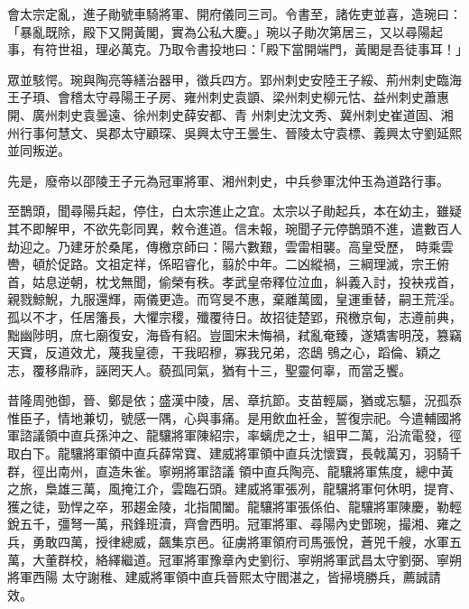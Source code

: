 \begin{pinyinscope}
 會太宗定亂，進子勛號車騎將軍、開府儀同三司。令書至，諸佐吏並喜，造琬曰：「暴亂既除，殿下又開黃閣，實為公私大慶。」琬以子勛次第居三，又以尋陽起事，有符世祖，理必萬克。乃取令書投地曰：「殿下當開端門，黃閣是吾徒事耳！」



 眾並駭愕。琬與陶亮等繕治器甲，徵兵四方。郢州刺史安陸王子綏、荊州刺史臨海王子頊、會稽太守尋陽王子房、雍州刺史袁顗、梁州刺史柳元怙、益州刺史蕭惠開、廣州刺史袁曇遠、徐州刺史薛安都、青
 州刺史沈文秀、冀州刺史崔道固、湘州行事何慧文、吳郡太守顧琛、吳興太守王曇生、晉陵太守袁標、義興太守劉延熙並同叛逆。



 先是，廢帝以邵陵王子元為冠軍將軍、湘州刺史，中兵參軍沈仲玉為道路行事。



 至鵲頭，聞尋陽兵起，停住，白太宗進止之宜。太宗以子勛起兵，本在幼主，雖疑其不即解甲，不欲先彰同異，敕令進道。信未報，琬聞子元停鵲頭不進，遣數百人劫迎之。乃建牙於桑尾，傳檄京師曰：陽六數艱，雲雷相襲。高皇受歷，
 時乘雲轡，頓於促路。文祖定祥，係昭睿化，翦於中年。二凶縱禍，三綱理滅，宗王俯首，姑息逆朝，枕戈無聞，偷榮有秩。孝武皇帝釋位泣血，糾義入討，投袂戎首，親戮鯨鯢，九服還輝，兩儀更造。而穹旻不惠，棄離萬國，皇運重替，嗣王荒淫。孤以不才，任居籓長，大懼宗稷，殲覆待日。故招徒楚郢，飛檄京甸，志遵前典，黜幽陟明，庶七廟復安，海昏有紹。豈圖宋未悔禍，弒亂奄臻，遂矯害明茂，篡竊天寶，反道效尤，蔑我皇德，干我昭穆，寡我兄弟，恣鴟
 鴞之心，蹈倫、穎之志，覆移鼎祚，誣罔天人。藐孤同氣，猶有十三，聖靈何辜，而當乏饗。



 昔隆周弛御，晉、鄭是依；盛漢中陵，居、章抗節。支苗輕屬，猶或忘驅，況孤忝惟臣子，情地兼切，號感一隅，心與事痛。是用飲血衽金，誓復宗祀。今遣輔國將軍諮議領中直兵孫沖之、龍驤將軍陳紹宗，率螭虎之士，組甲二萬，沿流電發，徑取白下。龍驤將軍領中直兵薛常寶、建威將軍領中直兵沈懷寶，長戟萬刃，羽騎千群，徑出南州，直造朱雀。寧朔將軍諮議
 領中直兵陶亮、龍驤將軍焦度，總中黃之旅，梟雄三萬，風掩江介，雲臨石頭。建威將軍張冽，龍驤將軍何休明，提育、獲之徒，勁悍之卒，邪趨金陵，北指閶闔。龍驤將軍張係伯、龍驤將軍陳慶，勒輕銳五千，彊弩一萬，飛鋒班瀆，齊會西明。冠軍將軍、尋陽內史鄧琬，撮湘、雍之兵，勇敢四萬，授律總威，飆集京邑。征虜將軍領府司馬張悅，蒼兕千艘，水軍五萬，大董群校，絡繹繼道。冠軍將軍豫章內史劉衍、寧朔將軍武昌太守劉弼、寧朔將軍西陽
 太守謝稚、建威將軍領中直兵晉熙太守閻湛之，皆掃境勝兵，薦誠請效。




\end{pinyinscope}
